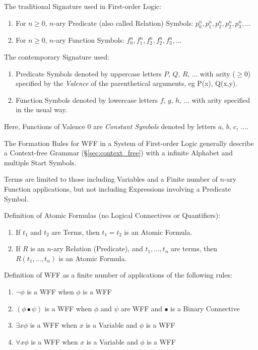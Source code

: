 The traditional Signature used in First-order Logic:
\begin{enumerate}
\item For $n \geq 0$, $n$-ary Predicate (also called Relation)
  Symbols: $p^{n}_0, p^{n}_1, p^{n}_2, p^{n}_2, p^{n}_3, \ldots$
\item For $n \geq 0$, $n$-ary Function Symbols: $f^{n}_0, f^{n}_1,
  f^{n}_2, f^{n}_2, f^{n}_3, \ldots$
\end{enumerate}
The contemporary Signature used:
\begin{enumerate}
\item Predicate Symbols denoted by uppercase letters $P$, $Q$, $R$,
  $\ldots$ with arity ($\geq 0$) specified by the \emph{Valence} of the
  parenthetical arguments, eg P(x), Q(x,y).
\item Function Symbols denoted by lowercase letters $f$, $g$, $h$,
  $\ldots$ with arity specified in the usual way.
\end{enumerate}
Here, Functions of Valence 0 are \emph{Constant Symbols} denoted by
letters $a$, $b$, $c$, $\ldots$.

The Formation Rules for WFF in a System of First-order Logic generally
describe a Context-free Grammar (\S\ref{sec:context_free}) with a
infinite Alphabet and multiple Start Symbols.

Terms are limited to those including Variables and a Finite number of
$n$-ary Function applications, but not including Expressions involving
a Predicate Symbol.

Definition of Atomic Formulas (no Logical Connectives or Quantifiers):
\begin{enumerate}
\item If $t_1$ and $t_2$ are Terms, then $t_1 = t_2$ is an Atomic Formula.
\item If $R$ is an $n$-ary Relation (Predicate), and $t_1,\ldots,t_n$
  are terms, then $R(t_1,\ldots,t_n)$ is an Atomic Formula.
\end{enumerate}

Definition of WFF as a finite number of applications of the following rules:
\begin{enumerate}
\item $\neg \phi$ is a WFF when $\phi$ is a WFF
\item $(\phi \bullet \psi)$ is a WFF when $\phi$ and $\psi$ are WFF
  and $\bullet$ is a Binary Connective
\item $\exists x \phi$ is a WFF when $x$ is a Variable and $\phi$ is a WFF
\item $\forall x \phi$ is a WFF when $x$ is a Variable and $\phi$ is a WFF
\end{enumerate}

